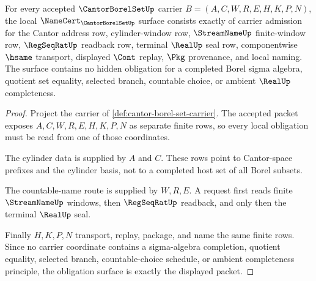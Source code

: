\begin{theorem}
\label{thm:cantor-borel-set-obligation-surface}
For every accepted $\CantorBorelSetUp$ carrier $B=(A,C,W,R,E,H,K,P,N)$, the local $\NameCert_{\CantorBorelSetUp}$ surface consists exactly of carrier admission for the Cantor address row, cylinder-window row, $\StreamNameUp$ finite-window row, $\RegSeqRatUp$ readback row, terminal $\RealUp$ seal row, componentwise $\hsame$ transport, displayed $\Cont$ replay, $\Pkg$ provenance, and local naming. The surface contains no hidden obligation for a completed Borel sigma algebra, quotient set equality, selected branch, countable choice, or ambient $\RealUp$ completeness.
\end{theorem}
\begin{proof}
Project the carrier of \autoref{def:cantor-borel-set-carrier}. The accepted packet exposes $A,C,W,R,E,H,K,P,N$ as separate finite rows, so every local obligation must be read from one of those coordinates.

The cylinder data is supplied by $A$ and $C$. These rows point to Cantor-space prefixes and the cylinder basis, not to a completed host set of all Borel subsets.

The countable-name route is supplied by $W,R,E$. A request first reads finite $\StreamNameUp$ windows, then $\RegSeqRatUp$ readback, and only then the terminal $\RealUp$ seal.

Finally $H,K,P,N$ transport, replay, package, and name the same finite rows. Since no carrier coordinate contains a sigma-algebra completion, quotient equality, selected branch, countable-choice schedule, or ambient completeness principle, the obligation surface is exactly the displayed packet.
\end{proof}

